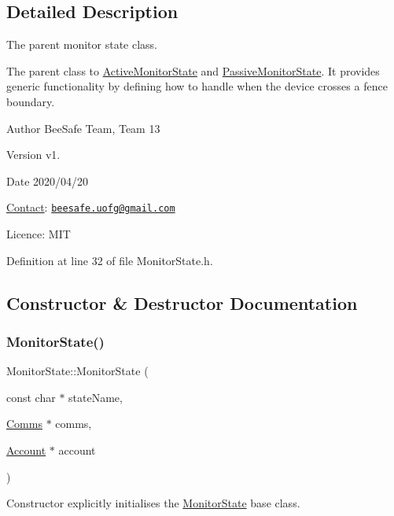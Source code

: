 \subsection{Detailed Description}
The parent monitor state class. 

The parent class to \hyperlink{class_active_monitor_state}{Active\+Monitor\+State} and \hyperlink{class_passive_monitor_state}{Passive\+Monitor\+State}. It provides generic functionality by defining how to handle when the device crosses a fence boundary.

\begin{DoxyAuthor}{Author}
Bee\+Safe Team, Team 13
\end{DoxyAuthor}
\begin{DoxyVersion}{Version}
v1.
\end{DoxyVersion}
\begin{DoxyDate}{Date}
2020/04/20
\end{DoxyDate}
\hyperlink{class_contact}{Contact}\+: \href{mailto:beesafe.uofg@gmail.com}{\tt beesafe.\+uofg@gmail.\+com}

Licence\+: M\+IT 

Definition at line 32 of file Monitor\+State.\+h.



\subsection{Constructor \& Destructor Documentation}
\mbox{\label{class_monitor_state_ace027ab9e5703ac4e4b808eeebc3c961}} 
\subsubsection{\texorpdfstring{Monitor\+State()}{MonitorState()}}
{\footnotesize\ttfamily Monitor\+State\+::\+Monitor\+State (\begin{DoxyParamCaption}\item[{const char $\ast$}]{state\+Name,  }\item[{\hyperlink{class_comms}{Comms} $\ast$}]{comms,  }\item[{\hyperlink{class_account}{Account} $\ast$}]{account }\end{DoxyParamCaption})}

Constructor explicitly initialises the \hyperlink{class_monitor_state}{Monitor\+State} base class.


